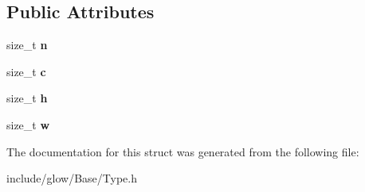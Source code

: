 \subsection*{Public Attributes}
\begin{DoxyCompactItemize}
\item 
\mbox{\label{structglow_1_1_shape_n_c_h_w_aba56075f81332002f3f4ba715e13dca2}} 
size\+\_\+t {\bfseries n}
\item 
\mbox{\label{structglow_1_1_shape_n_c_h_w_a02d60434dd9a437e9cb8d30249a73a4d}} 
size\+\_\+t {\bfseries c}
\item 
\mbox{\label{structglow_1_1_shape_n_c_h_w_a32eb273e89b5a848d52faa50d3e318bb}} 
size\+\_\+t {\bfseries h}
\item 
\mbox{\label{structglow_1_1_shape_n_c_h_w_ac761a92d9aa92b473d883817f7077d26}} 
size\+\_\+t {\bfseries w}
\end{DoxyCompactItemize}


The documentation for this struct was generated from the following file\+:\begin{DoxyCompactItemize}
\item 
include/glow/\+Base/Type.\+h\end{DoxyCompactItemize}
